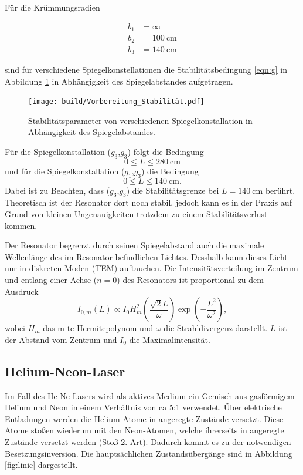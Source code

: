 Für die Krümmungsradien

\begin{align*}
    b_1 & = \infty \\
    b_2 & = \SI{100}{\centi\m} \\
    b_3 & = \SI{140}{\centi\m}
\end{align*}

sind für verschiedene Spiegelkonstellationen die Stabilitätsbedingung \eqref{eqn:g} in Abbildung \ref{fig:vor} in Abhängigkeit des Spiegelabstandes aufgetragen.

\begin{figure}
    \centering
    \texttt{[image: build/Vorbereitung\_Stabilität.pdf]}
    \caption{Stabilitätsparameter von verschiedenen Spiegelkonstallation in Abhängigkeit des Spiegelabstandes.}
    \label{fig:vor}
\end{figure}

Für die Spiegelkonstallation ($g_3$,$g_3$) folgt die Bedingung
\begin{equation}
    0 \leq L \leq \SI{280}{\cm}
\end{equation}
und für die Spiegelkonstallation ($g_1$,$g_3$) die Bedingung
\begin{equation}
    0 \leq L \leq \SI{140}{\cm}.
\end{equation}
Dabei ist zu Beachten, dass ($g_3$,$g_3$) die Stabilitätsgrenze bei $L = \SI{140}{\cm}$ berührt. Theoretisch ist der Resonator dort noch stabil, jedoch kann es in der Praxis auf Grund von kleinen Ungenauigkeiten trotzdem zu einem Stabilitätsverlust kommen.


\subject{Moden im Resonator}

Der Resonator begrenzt durch seinen Spiegelabstand auch die maximale Wellenlänge des im Resonator befindlichen Lichtes. Desshalb kann dieses Licht nur in diskreten Moden (TEM) auftauchen. 
Die Intensitätsverteilung im Zentrum und entlang einer Achse ($n=0$) des Resonators ist proportional zu dem Ausdruck 
\begin{equation}
    \label{eqn:mode}
    I_{0,m}(L) \propto I_0 H_m^2\left(\frac{\sqrt{2}L}{\omega}\right)\exp{\left(-\frac{L^2}{\omega^2}\right)},
\end{equation}
wobei $H_m$ das m-te Hermitepolynom und $\omega$ die Strahldivergenz darstellt. $L$ ist der Abstand vom Zentrum und $I_0$ die Maximalintensität.

\subsection{Helium-Neon-Laser}
Im Fall des He-Ne-Lasers wird als aktives Medium ein Gemisch aus gasförmigem Helium und Neon in einem Verhältnis von ca 5:1 verwendet.
Über elektrische Entladungen werden die Helium Atome in angeregte Zustände versetzt. Diese Atome stoßen wiederum mit den Neon-Atomen, welche ihrerseits in angeregte Zustände versetzt werden (Stoß 2. Art). Dadurch kommt es zu der notwendigen Besetzungsinversion. Die hauptsächlichen Zustandsübergänge sind in Abbildung \ref{fig:linie} dargestellt.

